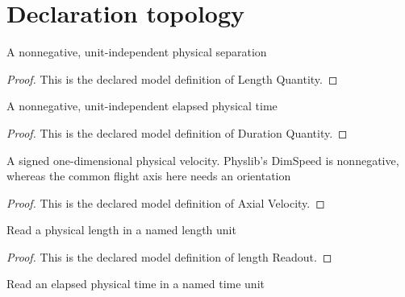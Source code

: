 \section{Declaration topology}
\begin{definition}
  \label{def:physics:phyx-mini-0607:phyxminiproblems-problemphyxmini0607-lengthquantity}
  A nonnegative, unit-independent physical separation
\end{definition}
\begin{proof}
  This is the declared model definition of Length Quantity.
\end{proof}
\begin{definition}
  \label{def:physics:phyx-mini-0607:phyxminiproblems-problemphyxmini0607-durationquantity}
  A nonnegative, unit-independent elapsed physical time
\end{definition}
\begin{proof}
  This is the declared model definition of Duration Quantity.
\end{proof}
\begin{definition}
  \label{def:physics:phyx-mini-0607:phyxminiproblems-problemphyxmini0607-axialvelocity}
  A signed one-dimensional physical velocity. Physlib's DimSpeed is nonnegative, whereas the common flight axis here needs an orientation
\end{definition}
\begin{proof}
  This is the declared model definition of Axial Velocity.
\end{proof}
\begin{definition}
  \label{def:physics:phyx-mini-0607:phyxminiproblems-problemphyxmini0607-lengthreadout}
  Read a physical length in a named length unit
\end{definition}
\begin{proof}
  This is the declared model definition of length Readout.
\end{proof}
\begin{definition}
  \label{def:physics:phyx-mini-0607:phyxminiproblems-problemphyxmini0607-durationreadout}
  Read an elapsed physical time in a named time unit
\end{definition}
